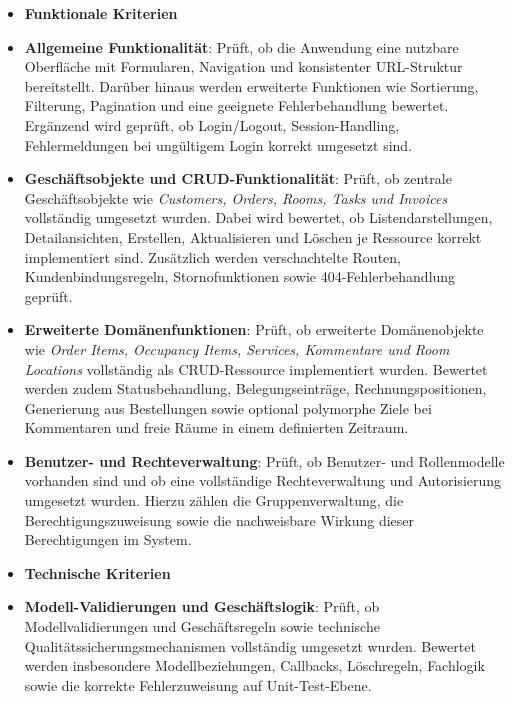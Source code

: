 \begin{itemize}

    \item[] \textbf{Funktionale Kriterien}

    \item \textbf{Allgemeine Funktionalität}: Prüft, ob die Anwendung eine nutzbare
    Oberfläche mit Formularen, Navigation und konsistenter URL-Struktur 
    bereitstellt. Darüber hinaus werden erweiterte Funktionen wie Sortierung, 
    Filterung, Pagination und eine 
    geeignete Fehlerbehandlung bewertet. Ergänzend wird geprüft, ob 
    Login/Logout, Session-Handling, Fehlermeldungen bei ungültigem Login 
    korrekt umgesetzt sind.

    \item \textbf{Geschäftsobjekte und CRUD-Funktionalität}: Prüft, ob zentrale 
    Geschäftsobjekte wie \textit{Customers, Orders, Rooms, Tasks und Invoices} 
    vollständig umgesetzt wurden. Dabei wird bewertet, ob Listendarstellungen, 
    Detailansichten, Erstellen, Aktualisieren und Löschen je Ressource korrekt 
    implementiert sind. Zusätzlich werden verschachtelte Routen, 
    Kundenbindungsregeln, Stornofunktionen sowie 404-Fehlerbehandlung geprüft.

    \item \textbf{Erweiterte Domänenfunktionen}: Prüft, ob erweiterte Domänenobjekte 
    wie \textit{\textit{Order Items, Occupancy Items, Services, Kommentare und Room Locations}} 
    vollständig als CRUD-Ressource implementiert wurden. Bewertet werden 
    zudem Statusbehandlung, Belegungseinträge, Rechnungspositionen, 
    Generierung aus Bestellungen sowie optional polymorphe Ziele bei 
    Kommentaren und freie Räume in einem definierten Zeitraum.

    \item \textbf{Benutzer- und Rechteverwaltung}: Prüft, ob Benutzer- und 
    Rollenmodelle vorhanden sind und ob eine vollständige Rechteverwaltung 
    und Autorisierung umgesetzt wurden. Hierzu zählen die Gruppenverwaltung, 
    die Berechtigungszuweisung sowie die nachweisbare Wirkung dieser 
    Berechtigungen im System.

    \item[] \textbf{Technische Kriterien}

    \item \textbf{Modell-Validierungen und Geschäftslogik}: Prüft, ob Modellvalidierungen und 
    Geschäftsregeln sowie technische Qualitätssicherungsmechanismen 
    vollständig umgesetzt wurden. Bewertet werden insbesondere 
    Modellbeziehungen, Callbacks, Löschregeln, Fachlogik sowie die korrekte 
    Fehlerzuweisung auf Unit-Test-Ebene.


\end{itemize}
